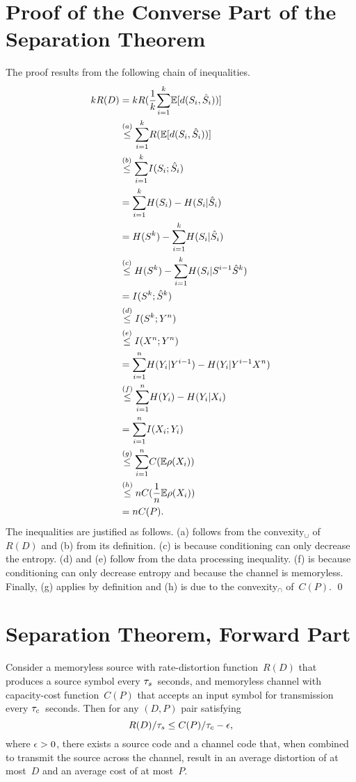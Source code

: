\begin{subappendices}

\section{Proof of the Converse Part of the Separation Theorem}
\label{app:separationproof}

The proof results from the following chain of inequalities.
{\allowdisplaybreaks
\begin{align*}
  kR(D) &= k R(\frac1k {\sum_{i=1}^k} \mathbb{E}[d(S_i, {\hat{S}}_i))] \\
  &\stackrel{(a)}{\le} {\sum_{i=1}^k} R(\mathbb{E}[d(S_i, {\hat{S}}_i))] \\
  &\stackrel{(b)}{\le} {\sum_{i=1}^k} I(S_i; {\hat{S}}_i) \\
  &= {\sum_{i=1}^k} H(S_i) - H(S_i|{\hat{S}}_i) \\
  &= H(S^k) - {\sum_{i=1}^k} H(S_i|{\hat{S}}_i) \\
  &\stackrel{(c)}{\le} H(S^k) - {\sum_{i=1}^k} H(S_i|S^{i-1} {\hat{S}}^k) \\
  &=I(S^k;{\hat{S}}^k) \\
  &\stackrel{(d)}{\le} I(S^k; Y^n) \\
  &\stackrel{(e)}{\le} I(X^n; Y^n) \\
  &= {\sum_{i=1}^n} H(Y_i|Y^{i-1}) - H(Y_i|Y^{i-1} X^n)  \\
  &\stackrel{(f)}{\le} {\sum_{i=1}^n} H(Y_i) - H(Y_i|X_i) \\
  &= {\sum_{i=1}^n} I(X_i; Y_i) \\
  &\stackrel{(g)}{\le} {\sum_{i=1}^n} C(\mathbb{E} \rho(X_i)) \\
  &\stackrel{(h)}{\le} n C(\frac1n \mathbb{E} \rho(X_i)) \\
  &= n C(P).
\end{align*}}%
The inequalities are justified as follows. (a) follows from the convexity$_\cup$
of~$R(D)$ and (b) from its definition. (c) is because
conditioning can only decrease the entropy. (d) and (e) follow from the data
processing inequality. (f) is because conditioning can only decrease entropy and
because the channel is memoryless. Finally, (g) applies by definition and (h) is
due to the convexity$_\cap$ of~$C(P)$.  \hfil\qed


\section{Separation Theorem, Forward Part}\label{app:separationforward}

\begin{theorem}
  \label{thm:separationforward}
  Consider a memoryless source with rate-distortion function~$R(D)$ that
  produces a source symbol every ${\tau_s}$~seconds, and memoryless channel with
  capacity-cost function~$C(P)$ that accepts an input symbol for transmission
  every ${\tau_c}$~seconds. Then for any $(D,P)$ pair satisfying
  \begin{equation}
    \label{eq:separationforward}
    R(D)/{\tau_s} \le C(P)/{\tau_c} - \epsilon,
  \end{equation}
  where $\epsilon > 0$, there exists a source code and a channel code that, when
  combined to transmit the source across the channel, result in an average
  distortion of at most~$D$ and an average cost of at most~$P$.
\end{theorem}


\end{subappendices}

